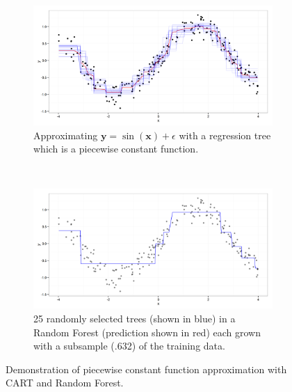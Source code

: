 \begin{figure}
        \centering
        \begin{subfigure}[b]{0.5\textwidth}
                \includegraphics[width=\textwidth]{figures/forest_approximation.png}
                \caption{Approximating $\mathbf{y} = \sin(\mathbf{x}) + \epsilon$ with a regression tree which is a piecewise constant function.}
                \label{fig:cart_approx}
        \end{subfigure}%
        ~ %
        \begin{subfigure}[b]{0.5\textwidth}
                \includegraphics[width=\textwidth]{figures/cart_approximation.png}
                \caption{25 randomly selected trees (shown in blue) in a Random Forest (prediction shown in red) each grown with a subsample (.632) of the training data.}
                \label{fig:rf_approx}
        \end{subfigure}
        \caption{Demonstration of piecewise constant function approximation with CART and Random Forest.}
        \label{fig:interaction}
\end{figure}

